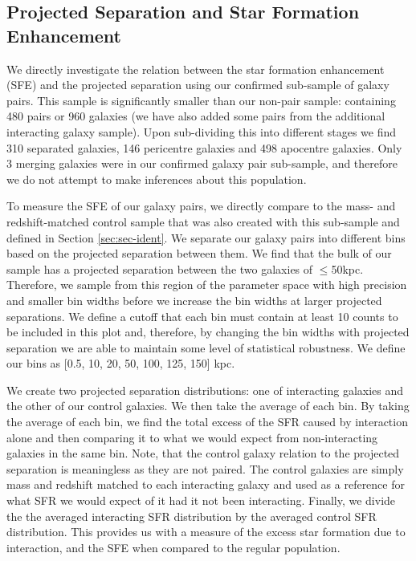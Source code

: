\subsection{Projected Separation and Star Formation Enhancement}
\noindent We directly investigate the relation between the star formation enhancement (SFE) and the projected separation using our confirmed sub-sample of galaxy pairs. This sample is significantly smaller than our non-pair sample: containing 480 pairs or 960 galaxies (we have also added some pairs from the additional interacting galaxy sample). Upon sub-dividing this into different stages we find 310 separated galaxies, 146 pericentre galaxies and 498 apocentre galaxies. Only 3 merging galaxies were in our confirmed galaxy pair sub-sample, and therefore we do not attempt to make inferences about this population. 

To measure the SFE of our galaxy pairs, we directly compare to the mass- and redshift-matched control sample that was also created with this sub-sample and defined in Section \ref{sec:sec-ident}. We separate our galaxy pairs into different bins based on the projected separation between them. We find that the bulk of our sample has a projected separation between the two galaxies of $\leq$50kpc. Therefore, we sample from this region of the parameter space with high precision and smaller bin widths before we increase the bin widths at larger projected separations. We define a cutoff that each bin must contain at least 10 counts to be included in this plot and, therefore, by changing the bin widths with projected separation we are able to maintain some level of statistical robustness. We define our bins as [0.5, 10, 20, 50, 100, 125, 150] kpc.

We create two projected separation distributions: one of interacting galaxies and the other of our control galaxies. We then take the average of each bin. By taking the average of each bin, we find the total excess of the SFR caused by interaction alone and then comparing it to what we would expect from non-interacting galaxies in the same bin. Note, that the control galaxy relation to the projected separation is meaningless as they are not paired. The control galaxies are simply mass and redshift matched to each interacting galaxy and used as a reference for what SFR we would expect of it had it not been interacting. Finally, we divide the the averaged interacting SFR distribution by the averaged control SFR distribution. This provides us with a measure of the excess star formation due to interaction, and the SFE when compared to the regular population.


